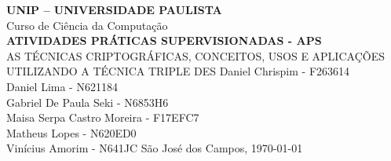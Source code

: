 
\frenchspacing 

\newpage

\pretextual

\begin{capa} 
    \begin{center}
        \begin{minipage}{1\textwidth} 
            \large\centering{}
        \end{minipage}
    \end{center}
    \begin{center}
        \LARGE\textbf{UNIP -- UNIVERSIDADE PAULISTA\\} 
        \LARGE Curso de Ciência da Computação\\
        \vfill
        \ABNTEXchapterfont\Large\textbf{\MakeUppercase{ATIVIDADES PRÁTICAS SUPERVISIONADAS - APS}}
        \\\small{AS TÉCNICAS CRIPTOGRÁFICAS, CONCEITOS, USOS E APLICAÇÕES\\UTILIZANDO A TÉCNICA TRIPLE DES} 
        \vfill
        \normalsize
        Daniel Chrispim - F263614\\
        Daniel Lima - N621184\\
        Gabriel De Paula Seki - N6853H6\\
        Maisa Serpa Castro Moreira - F17EFC7\\
        Matheus Lopes - N620ED0\\
        Vinícius Amorim - N641JC
        \vfill
        São José dos Campos, \today 
    \end{center}
\end{capa}

